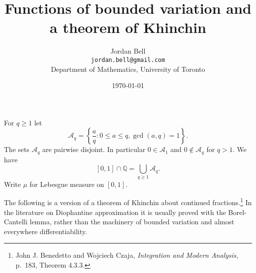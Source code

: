 \documentclass{article}
\theoremstyle{definition}
\begin{document}
\title{Functions of bounded variation and a theorem of Khinchin}
\author{Jordan Bell\\ \texttt{jordan.bell@gmail.com}\\Department of Mathematics, University of Toronto}
\date{\today}

\maketitle

For $q \geq 1$ let
\[
\mathscr{A}_q = \left\{\frac{a}{q}: 0 \leq a \leq q, \gcd(a,q)=1\right\}.
\]
The sets $\mathscr{A}_q$ are pairwise disjoint. In particular $0 \in \mathscr{A}_1$ and $0 \not \in \mathscr{A}_q$ for $q>1$.
We have
\[
[0,1] \cap \mathbb{Q} = \bigcup_{q \geq 1} \mathscr{A}_q.
\]
Write $\mu$ for Lebesgue measure on $[0,1]$. 


The following is a version of a theorem of Khinchin about continued fractions.\footnote{John J. Benedetto and Wojciech Czaja, {\em Integration and Modern Analysis}, p.~183, Theorem 4.3.3.} In the literature on Diophantine approximation it is usually proved with the Borel-Cantelli lemma, rather than the machinery of bounded variation and 
almost everywhere differentiability.
\end{document}
